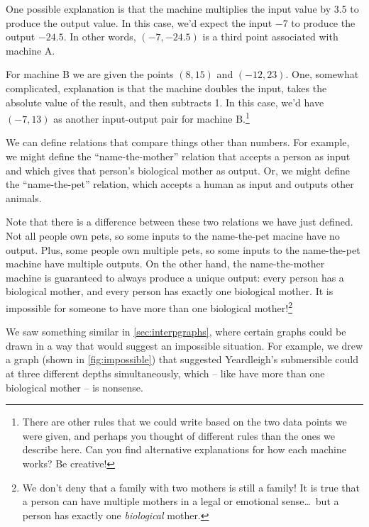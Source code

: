 One possible explanation is that the machine multiplies the input value by 3.5 to produce the output value. In this case, we'd expect the input $-7$ to produce the output $-24.5$. In other words, $(-7, -24.5)$ is a third point associated with machine A.

For machine B we are given the points $(8, 15)$ and $(-12, 23)$. One, somewhat complicated, explanation is that the machine doubles the input, takes the absolute value of the result, and then subtracts 1. In this case, we'd have $(-7, 13)$ as another input-output pair for machine B.\footnote{There are other rules that we could write based on the two data points we were given, and perhaps you thought of different rules than the ones we describe here. Can you find alternative explanations for how each machine works? Be creative!}

We can define relations that compare things other than numbers. For example, we might define the ``name-the-mother'' relation that accepts a person as input and which gives that person's biological mother as output. Or, we might define the ``name-the-pet'' relation, which accepts a human as input and outputs other animals.

Note that there is a difference between these two relations we have just defined. Not all people own pets, so some inputs to the name-the-pet macine have no output. Plus, some people own multiple pets, so some inputs to the name-the-pet machine have multiple outputs. On the other hand, the name-the-mother machine is guaranteed to always produce a unique output: every person has a biological mother, and every person has exactly one biological mother. It is impossible for someone to have more than one biological mother!\footnote{We don't deny that a family with two mothers is still a family! It is true that a person can have multiple mothers in a legal or emotional sense\ldots\ but a person has exactly one \textit{biological} mother.}

We saw something similar in \cref{sec:interpgraphs}, where certain graphs could be drawn in a way that would suggest an impossible situation. For example, we drew a graph (shown in \cref{fig:impossible}) that suggested Yeardleigh's submersible could at three different depths simultaneously, which -- like have more than one biological mother -- is nonsense.

